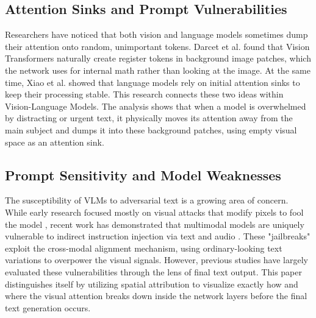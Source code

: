 \documentclass[11pt, letterpaper]{article}
\begin{document}
\subsection{Attention Sinks and Prompt Vulnerabilities}
Researchers have noticed that both vision and language models sometimes dump their attention onto random, unimportant tokens. Darcet et al. \citep{darcet2024visiontransformersneedregisters} found that Vision Transformers naturally create register tokens in background image patches, which the network uses for internal math rather than looking at the image. At the same time, Xiao et al. \citep{xiao2024efficientstreaminglanguagemodels} showed that language models rely on initial attention sinks to keep their processing stable. This research connects these two ideas within Vision-Language Models. The analysis shows that when a model is overwhelmed by distracting or urgent text, it physically moves its attention away from the main subject and dumps it into these background patches, using empty visual space as an attention sink.

\subsection{Prompt Sensitivity and Model Weaknesses}

The susceptibility of VLMs to adversarial text is a growing area of concern. While early research focused mostly on visual attacks that modify pixels to fool the model \citep{qi2023visualadversarialexamplesjailbreak}, recent work has demonstrated that multimodal models are uniquely vulnerable to indirect instruction injection via text and audio \citep{bagdasaryan2023abusing}. These "jailbreaks" exploit the cross-modal alignment mechanism, using ordinary-looking text variations to overpower the visual signals. However, previous studies have largely evaluated these vulnerabilities through the lens of final text output. This paper distinguishes itself by utilizing spatial attribution to visualize exactly how and where the visual attention breaks down inside the network layers before the final text generation occurs.
\end{document}
